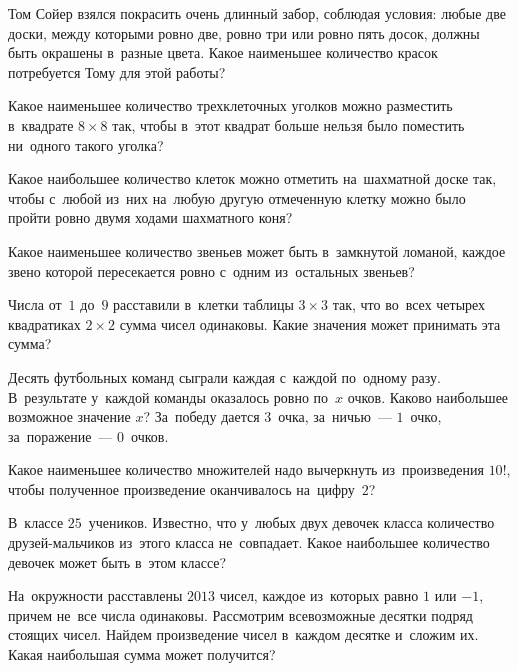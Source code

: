 \begin{problems}

\item
Том Сойер взялся покрасить очень длинный забор, соблюдая условия: любые две
доски, между которыми ровно две, ровно три или ровно пять досок, должны быть
окрашены в~разные цвета.
Какое наименьшее количество красок потребуется Тому для этой работы?

\item
Какое наименьшее количество трехклеточных уголков можно разместить
в~квадрате $8 \times 8$ так, чтобы в~этот квадрат больше нельзя было поместить
ни~одного такого уголка?

\item
Какое наибольшее количество клеток можно отметить на~шахматной доске так, чтобы
с~любой из~них на~любую другую отмеченную клетку можно было пройти ровно двумя
ходами шахматного коня?

\item
Какое наименьшее количество звеньев может быть в~замкнутой ломаной, каждое
звено которой пересекается ровно с~одним из~остальных звеньев?

\item
Числа от~$1$ до~$9$ расставили в~клетки таблицы $3 \times 3$ так, что во~всех
четырех квадратиках $2 \times 2$ сумма чисел одинаковы.
Какие значения может принимать эта сумма?

\item
Десять футбольных команд сыграли каждая с~каждой по~одному разу.
В~результате у~каждой команды оказалось ровно по~$x$ очков.
Каково наибольшее возможное значение $x$?
За~победу дается $3$~очка, за~ничью~--- $1$~очко, за~поражение~--- $0$~очков.

\item
Какое наименьшее количество множителей надо вычеркнуть из~произведения $10!$,
чтобы полученное произведение оканчивалось на~цифру~$2$?

\item
В~классе $25$~учеников.
Известно, что у~любых двух девочек класса количество друзей-мальчиков из~этого
класса не~совпадает.
Какое наибольшее количество девочек может быть в~этом классе?

\item
На~окружности расставлены $2013$ чисел, каждое из~которых равно $1$ или $-1$,
причем не~все числа одинаковы.
Рассмотрим всевозможные десятки подряд стоящих чисел.
Найдем произведение чисел в~каждом десятке и~сложим их.
Какая наибольшая сумма может получится?


\end{problems}
